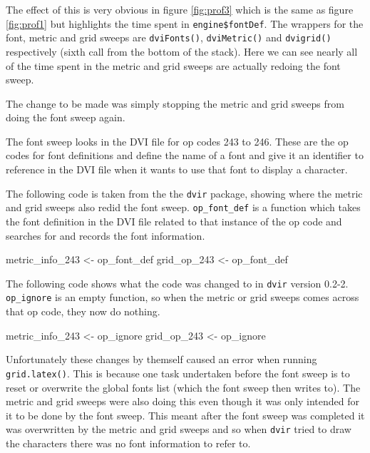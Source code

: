 \documentclass[]{article}
\newenvironment{Shaded}{\begin{snugshade}}{\end{snugshade}}
\newcommand{\DecValTok}[1]{\textcolor[rgb]{0.00,0.00,0.81}{#1}}
\newcommand{\StringTok}[1]{\textcolor[rgb]{0.31,0.60,0.02}{#1}}
\newcommand{\NormalTok}[1]{#1}
\begin{document}
The effect of this is very obvious in figure \ref{fig:prof3} which is
the same as figure \ref{fig:prof1} but highlights the time spent in
\texttt{engine\$fontDef}. The wrappers for the font, metric and grid
sweeps are \texttt{dviFonts()}, \texttt{dviMetric()} and
\texttt{dvigrid()} respectively (sixth call from the bottom of the
stack). Here we can see nearly all of the time spent in the metric and
grid sweeps are actually redoing the font sweep.

The change to be made was simply stopping the metric and grid sweeps
from doing the font sweep again.

The font sweep looks in the DVI file for op codes 243 to 246. These are
the op codes for font definitions and define the name of a font and give
it an identifier to reference in the DVI file when it wants to use that
font to display a character.

The following code is taken from the the \texttt{dvir} package, showing
where the metric and grid sweeps also redid the font sweep.
\texttt{op\_font\_def} is a function which takes the font definition in
the DVI file related to that instance of the op code and searches for
and records the font information.

\begin{Shaded}
\begin{Highlighting}[]
\NormalTok{metric_info_}\DecValTok{243}\NormalTok{ <-}\StringTok{ }\NormalTok{op_font_def}
\NormalTok{grid_op_}\DecValTok{243}\NormalTok{ <-}\StringTok{ }\NormalTok{op_font_def}
\end{Highlighting}
\end{Shaded}

The following code shows what the code was changed to in \texttt{dvir}
version 0.2-2. \texttt{op\_ignore} is an empty function, so when the
metric or grid sweeps comes across that op code, they now do nothing.

\begin{Shaded}
\begin{Highlighting}[]
\NormalTok{metric_info_}\DecValTok{243}\NormalTok{ <-}\StringTok{ }\NormalTok{op_ignore}
\NormalTok{grid_op_}\DecValTok{243}\NormalTok{ <-}\StringTok{ }\NormalTok{op_ignore}
\end{Highlighting}
\end{Shaded}

Unfortunately these changes by themself caused an error when running
\texttt{grid.latex()}. This is because one task undertaken before the
font sweep is to reset or overwrite the global fonts list (which the
font sweep then writes to). The metric and grid sweeps were also doing
this even though it was only intended for it to be done by the font
sweep. This meant after the font sweep was completed it was overwritten
by the metric and grid sweeps and so when \texttt{dvir} tried to draw
the characters there was no font information to refer to.
\end{document}
